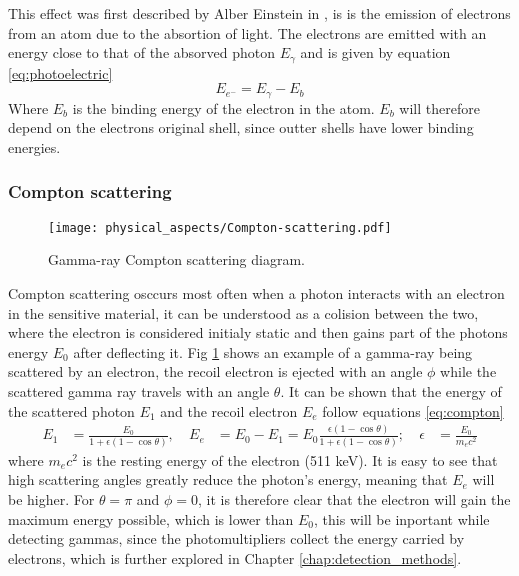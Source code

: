 This effect was first described by Alber Einstein in \cite{einstein1905heuristic}, is is the emission of electrons from an atom due to the absortion of light. The electrons are emitted with an energy close to that of the absorved photon $E_\gamma$ and is given by equation \eqref{eq:photoelectric}
\begin{equation}
  E_{e^-} = E_\gamma - E_b \label{eq:photoelectric}
\end{equation}
Where $E_b$ is the binding energy of the electron in the atom. $E_b$ will therefore depend on the electrons original shell, since outter shells have lower binding energies.

\subsubsection{Compton scattering}

\begin{figure}[H]
  \centering
  \texttt{[image: physical\_aspects/Compton-scattering.pdf]}
  \caption{\label{fig:Compton_scattering_diagram}Gamma-ray Compton scattering diagram.}
\end{figure}

Compton scattering osccurs most often when a photon interacts with an electron in the sensitive material, it can be understood as a colision between the two, where the electron is considered initialy static and then gains part of the photons energy $E_0$ after deflecting it. Fig \ref{fig:Compton_scattering_diagram} shows an example of a gamma-ray being scattered by an electron, the recoil electron is ejected with an angle $\phi$ while the scattered gamma ray travels with an angle $\theta$. It can be shown that the energy of the scattered photon $E_{1}$ and the recoil electron $E_e$ follow equations \eqref{eq:compton}
\begin{align}
  E_{1} &= \frac{E_0}{1+\epsilon(1-\cos\theta)} \label{eq:compton},~ & E_e &= E_0 - E_1 = E_0\frac{\epsilon(1-\cos\theta)}{1+\epsilon(1-\cos\theta)};~ & \epsilon&=\frac{E_0}{m_{e}c^2} 
\end{align}
where $m_e c^2$ is the resting energy of the electron (511 \unit{\kilo\eV}). It is easy to see that high scattering angles greatly reduce the photon's energy, meaning that $E_e$ will be higher. For $\theta=\pi$ and $\phi=0$, it is therefore clear that the electron will gain the maximum energy possible, which is lower than $E_0$, this will be inportant while detecting gammas, since the photomultipliers collect the energy carried by electrons, which is further explored in Chapter \ref{chap:detection_methods}.

